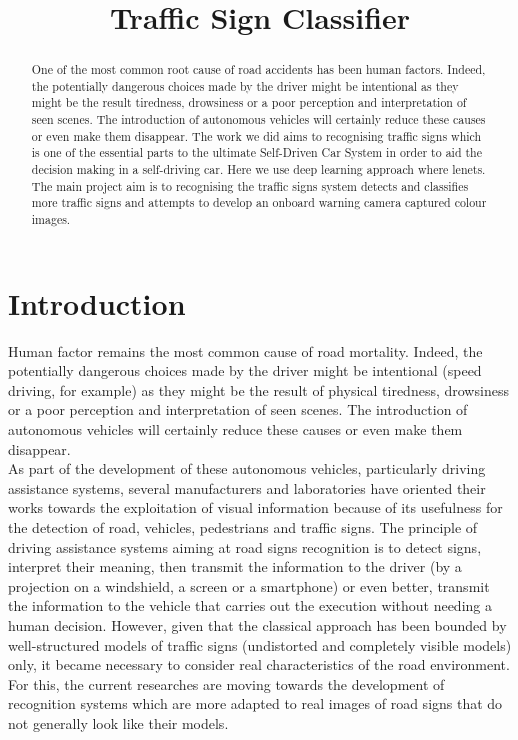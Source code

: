\documentclass{article}
\title{\fontsize{30}{40}\selectfont Traffic Sign Classifier}
\begin{document}
%
\maketitle
%
\begin{abstract}
One of the most common root cause of road accidents has been human factors. Indeed, the potentially dangerous choices made by the driver might be intentional as they might be the result tiredness, drowsiness or a poor perception and interpretation of seen scenes. The introduction of autonomous vehicles will certainly reduce these causes or even make them disappear. The work we did aims to recognising traffic signs which is one of the essential parts to the ultimate Self-Driven Car System in order to aid the decision making in a self-driving car. Here we use deep learning approach where lenets. The main project aim is to recognising the traffic signs system detects and classifies more traffic signs and attempts to develop an onboard warning camera captured colour images.
\end{abstract}
%

%
\section{Introduction}
\label{sec:intro}
Human factor remains the most common cause of road
mortality. Indeed, the potentially dangerous choices made by
the driver might be intentional (speed driving, for example) as
they might be the result of physical tiredness, drowsiness or a
poor perception and interpretation of seen scenes. The
introduction of autonomous vehicles will certainly reduce these
causes or even make them disappear.\\
As part of the development of these autonomous vehicles,
particularly driving assistance systems, several manufacturers
and laboratories have oriented their works towards the
exploitation of visual information because of its usefulness for
the detection of road, vehicles, pedestrians and traffic signs.
The principle of driving assistance systems aiming at road signs
recognition is to detect signs, interpret their meaning, then
transmit the information to the driver (by a projection on a
windshield, a screen or a smartphone) or even better, transmit
the information to the vehicle that carries out the execution
without needing a human decision. However, given that the
classical approach has been bounded by well-structured models
of traffic signs (undistorted and completely visible models)
only, it became necessary to consider real characteristics of the
road environment. For this, the current researches are moving
towards the development of recognition systems which are
more adapted to real images of road signs that do not generally
look like their models.
\end{document}
